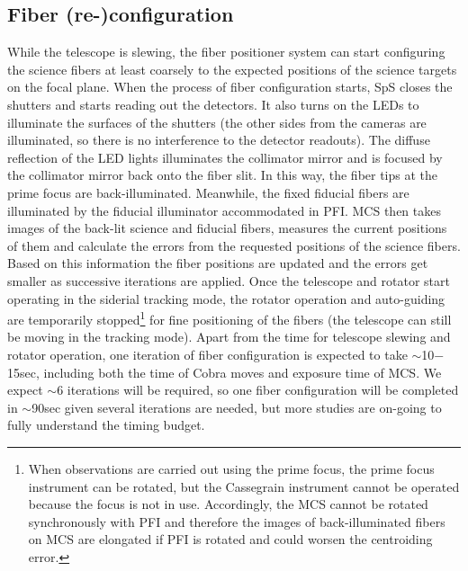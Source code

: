 \documentclass[a4paper]{article}
\begin{document}
\subsection{Fiber (re-)configuration}
\label{subsec:fiber-reconfig}
While the telescope is slewing, the fiber positioner system can start
configuring the science fibers at least coarsely to the expected
positions of the science targets on the focal plane. When the process
of fiber configuration starts, SpS closes the shutters and starts
reading out the detectors. It also turns on the LEDs to illuminate the
surfaces of the shutters (the other sides from the cameras are
illuminated, so there is no interference to the detector
readouts). The diffuse reflection of the LED lights illuminates the
collimator mirror and is focused by the collimator mirror back onto
the fiber slit. In this way, the fiber tips at the prime focus are
back-illuminated. Meanwhile, the fixed fiducial fibers are illuminated
by the fiducial illuminator accommodated in PFI. MCS then takes images
of the back-lit science and fiducial fibers, measures the current
positions of them and calculate the errors from the requested
positions of the science fibers. Based on this information the fiber
positions are updated and the errors get smaller as successive
iterations are applied. Once the telescope and rotator start operating
in the siderial tracking mode, the rotator operation and auto-guiding
are temporarily stopped\footnote{When observations are carried out
  using the prime focus, the prime focus instrument can be rotated,
  but the Cassegrain instrument cannot be operated because the focus
  is not in use. Accordingly, the MCS cannot be rotated synchronously
  with PFI and therefore the images of back-illuminated fibers on MCS
  are elongated if PFI is rotated and could worsen the centroiding
  error.}  for fine positioning of the fibers (the telescope can still
be moving in the tracking mode).
%
Apart from the time for telescope slewing and rotator operation, one
iteration of fiber configuration is expected to take $\sim$10$-$15sec,
including both the time of Cobra moves and exposure time of MCS. We
expect $\sim$6 iterations will be required, so one fiber
configuration will be completed in $\sim$90sec given several
iterations are needed, but more studies are on-going to fully
understand the timing budget.
\end{document}
